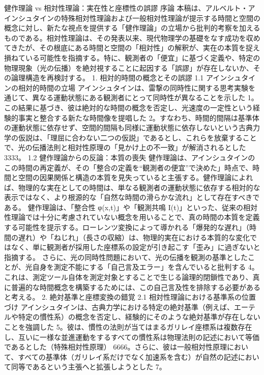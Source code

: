 \documentclass{article}
\begin{document}
健作理論 vs 相対性理論：実在性と座標性の誤謬
序論
本稿は、アルベルト・アインシュタインの特殊相対性理論および一般相対性理論が提示する時間と空間の概念に対し、新たな視点を提供する「健作理論」の立場から批判的考察を加えるものである。相対性理論は、その発表以来、現代物理学の基礎をなす成功を収めてきたが、その根底にある時間と空間の「相対性」の解釈が、実在の本質を捉え損ねている可能性を指摘する。特に、観測者の「便宜」に基づく定義や、特定の物理現象（光の伝播）を絶対視することに起因する「誤謬」が存在しないか、その論理構造を再検討する。
1. 相対的時間の概念とその誤謬
1.1 アインシュタインの相対的時間の立場
アインシュタインは、雷撃の同時性に関する思考実験を通じて、異なる運動状態にある観測者にとって同時性が異なることを示した 1。この結果に基づき、彼は絶対的な時間の概念を否定し、光速度の一定性という経験的事実と整合する新たな時間像を提唱した 2。すなわち、時間的間隔は基準体の運動状態に依存せず、空間的間隔も同様に運動状態に依存しないという古典力学の仮説は、「理屈に合わない二つの仮説」であるとし、これらを放棄することで、光の伝播法則と相対性原理の「見かけ上の不一致」が解消されるとした 3333。
1.2 健作理論からの反論：本質の喪失
健作理論は、アインシュタインのこの時間の再定義が、その「整合の定義を“観測者の便宜”で決めた」時点で、時間と空間の因果関係と構造の本質を見失っていると主張する。健作理論によれば、物理的な実在としての時間は、単なる観測者の運動状態に依存する相対的な表示ではなく、より根源的な「自然な時間の滑らかな流れ」として存在すべきである。
健作理論は、「整合性 φ(x,t)」や「観測共鳴 I(t)」といった、従来の相対性理論では十分に考慮されていない概念を用いることで、真の時間の本質を定義する可能性を提示する。ローレンツ変換によって導かれる「爆発的な遅れ」（時間の遅れ）や「ねじれ」（長さの収縮）は、物理的実在における本質的な変化ではなく、単に観測者が採用した座標系の設定が引き起こす「歪み」に過ぎないと指摘する。
さらに、光の同時性問題において、光の伝播を観測の基準としたことが、光自身を測定不能にする「自己言及エラー」を含んでいると批判する 4。これは、測定ツール自体を測定対象とすることで生じる論理的閉鎖性であり、真に普遍的な時間概念を構築するためには、この自己言及性を排除する必要があると考える。
2. 絶対基準と座標変換の錯覚
2.1 相対性理論における基準系の位置づけ
アインシュタインは、古典力学における特定の絶対基準（例えば、エーテルや特定の慣性系）の概念を否定し、経験的にそのような絶対基準が存在しないことを強調した 5。彼は、慣性の法則が当てはまるガリレイ座標系は複数存在し、互いに一様な並進運動をするすべての慣性系は物理法則の記述において等価であるとした（特殊相対性原理） 6666。さらに、彼は一般相対性原理において、すべての基準体（ガリレイ系だけでなく加速系を含む）が自然の記述において同等であるという主張へと拡張しようとした 7。
\end{document}

